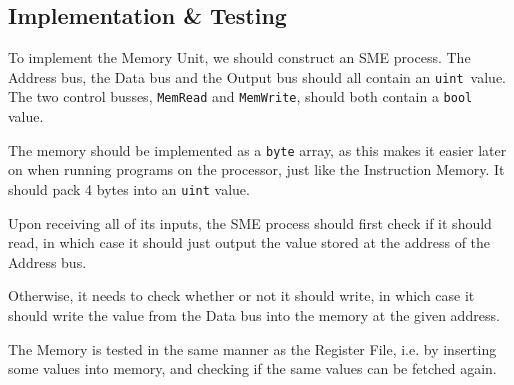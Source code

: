 \documentclass{beamer}
\begin{document}
\subsection{Implementation \& Testing}
\begin{frame}
    To implement the Memory Unit, we should construct an SME process. The
    Address bus, the Data bus and the Output bus should all contain an
    \texttt{uint} value. The two control busses, \texttt{MemRead} and
    \texttt{MemWrite}, should both contain a \texttt{bool} value.

    \vspace{\baselineskip}
    The memory should be implemented as a \texttt{byte} array, as this makes it
    easier later on when running programs on the processor, just like the
    Instruction Memory. It should pack 4 bytes into an \texttt{uint} value.
\end{frame}
\begin{frame}
    Upon receiving all of its inputs, the SME process should first check if it
    should read, in which case it should just output the value stored at the
    address of the Address bus.

    \vspace{\baselineskip}
    Otherwise, it needs to check whether or not it should write, in which case
    it should write the value from the Data bus into the memory at the given
    address.

    \vspace{\baselineskip}
    The Memory is tested in the same manner as the Register File, i.e. by
    inserting some values into memory, and checking if the same values can be
    fetched again.
\end{frame}
\end{document}
